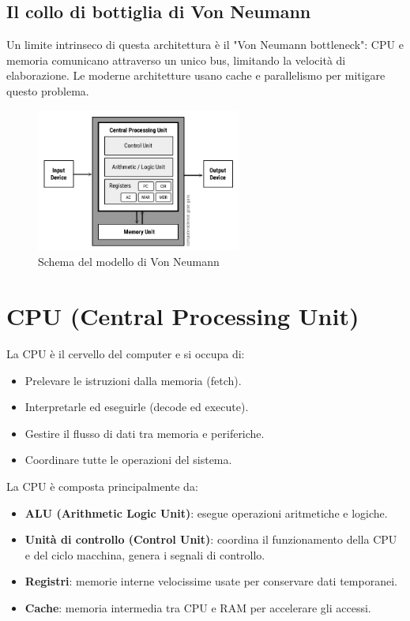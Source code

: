 \documentclass[12pt,a4paper]{article}
\begin{document}
\subsection{Il collo di bottiglia di Von Neumann}
Un limite intrinseco di questa architettura è il "Von Neumann bottleneck": CPU e memoria comunicano attraverso un unico bus, limitando la velocità di elaborazione. Le moderne architetture usano cache e parallelismo per mitigare questo problema.

\begin{figure}[h]
    \centering
    \includegraphics[width=0.6\textwidth]{images/Von-Neumann-Architecture-Diagram.jpg}
    \caption{Schema del modello di Von Neumann}
\end{figure}

\section{CPU (Central Processing Unit)}
La CPU è il cervello del computer e si occupa di:
\begin{itemize}
    \item Prelevare le istruzioni dalla memoria (fetch).
    \item Interpretarle ed eseguirle (decode ed execute).
    \item Gestire il flusso di dati tra memoria e periferiche.
    \item Coordinare tutte le operazioni del sistema.
\end{itemize}

La CPU è composta principalmente da:
\begin{itemize}
    \item \textbf{ALU (Arithmetic Logic Unit)}: esegue operazioni aritmetiche e logiche.
    \item \textbf{Unità di controllo (Control Unit)}: coordina il funzionamento della CPU e del ciclo macchina, genera i segnali di controllo.
    \item \textbf{Registri}: memorie interne velocissime usate per conservare dati temporanei.
    \item \textbf{Cache}: memoria intermedia tra CPU e RAM per accelerare gli accessi.
\end{itemize}
\end{document}
